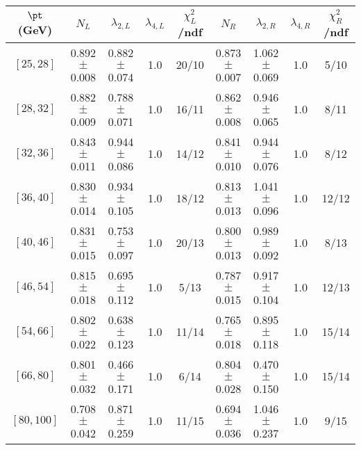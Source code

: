 \begin{tabular}{c||c|c|c|c||c|c|c|c}
$\pt$ (GeV) & $N_L$ & $\lambda_{2,L}$ & $\lambda_{4,L}$  & $\chi^2_L$/ndf & $N_R$ & $\lambda_{2,R}$ & $\lambda_{4,R}$  & $\chi^2_R$/ndf \\
\hline
$[25, 28]$ & 0.892$\pm$0.008 & 0.882$\pm$0.074 & 1.0 & 20/10 & 0.873$\pm$0.007 & 1.062$\pm$0.069 & 1.0 & 5/10\\
$[28, 32]$ & 0.882$\pm$0.009 & 0.788$\pm$0.071 & 1.0 & 16/11 & 0.862$\pm$0.008 & 0.946$\pm$0.065 & 1.0 & 8/11\\
$[32, 36]$ & 0.843$\pm$0.011 & 0.944$\pm$0.086 & 1.0 & 14/12 & 0.841$\pm$0.010 & 0.944$\pm$0.076 & 1.0 & 8/12\\
$[36, 40]$ & 0.830$\pm$0.014 & 0.934$\pm$0.105 & 1.0 & 18/12 & 0.813$\pm$0.013 & 1.041$\pm$0.096 & 1.0 & 12/12\\
$[40, 46]$ & 0.831$\pm$0.015 & 0.753$\pm$0.097 & 1.0 & 20/13 & 0.800$\pm$0.013 & 0.989$\pm$0.092 & 1.0 & 8/13\\
$[46, 54]$ & 0.815$\pm$0.018 & 0.695$\pm$0.112 & 1.0 & 5/13 & 0.787$\pm$0.015 & 0.917$\pm$0.104 & 1.0 & 12/13\\
$[54, 66]$ & 0.802$\pm$0.022 & 0.638$\pm$0.123 & 1.0 & 11/14 & 0.765$\pm$0.018 & 0.895$\pm$0.118 & 1.0 & 15/14\\
$[66, 80]$ & 0.801$\pm$0.032 & 0.466$\pm$0.171 & 1.0 & 6/14 & 0.804$\pm$0.028 & 0.470$\pm$0.150 & 1.0 & 15/14\\
$[80, 100]$ & 0.708$\pm$0.042 & 0.871$\pm$0.259 & 1.0 & 11/15 & 0.694$\pm$0.036 & 1.046$\pm$0.237 & 1.0 & 9/15\\
\end{tabular}
